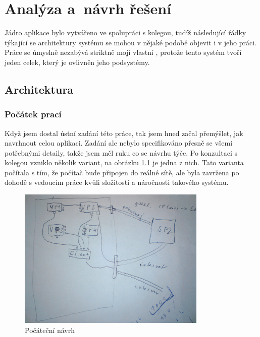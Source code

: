 \chapter{Analýza a~návrh řešení}
% 
Jádro aplikace bylo vytvářeno ve spolupráci s kolegou, tudíž následující řádky týkající se architektury systému se mohou v nějaké podobě objevit i v jeho práci. Práce se úmyslně nezabývá striktně mojí vlastní , protože tento systém tvoří jeden celek, který je ovlivněn jeho podsystémy.

\section{Architektura}

\subsection{Počátek prací}
Když jsem dostal ústní zadání této práce, tak jsem hned začal přemýšlet, jak navrhnout celou aplikaci. Zadání ale nebylo specifikováno přesně se všemi potřebnými detaily, takže jsem měl  ruku co se návrhu týče. Po konzultaci s kolegou vzniklo několik variant, na obrázku \ref{fig:navrh} je jedna z nich. Tato varianta počítala s tím, že počítač bude připojen do reálné sítě, ale byla zavržena po dohodě s vedoucím práce kvůli složitosti a náročnosti takového systému. 

\begin{figure}[h]
\begin{center}
\includegraphics[width=9cm]{figures/navrh}
\caption{Počáteční návrh}
\label{fig:navrh}
\end{center}
\end{figure}

